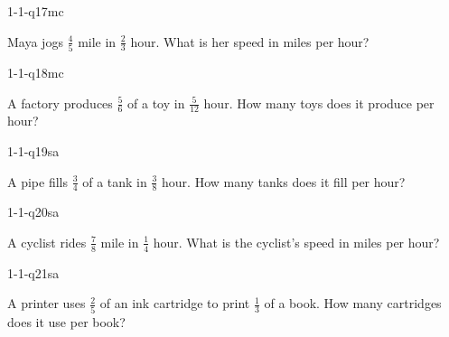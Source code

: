 \begin{practiceQuestion}{1-1-q17}{mc}
\begin{questionText}
Maya jogs $\frac{4}{5}$ mile in $\frac{2}{3}$ hour. What is her speed in miles per hour?
\end{questionText}
\end{practiceQuestion}

\begin{practiceQuestion}{1-1-q18}{mc}
\begin{questionText}
A factory produces $\frac{5}{6}$ of a toy in $\frac{5}{12}$ hour. How many toys does it produce per hour?
\end{questionText}
\end{practiceQuestion}


\begin{practiceQuestion}{1-1-q19}{sa}
\begin{questionText}
A pipe fills $\frac{3}{4}$ of a tank in $\frac{3}{8}$ hour. How many tanks does it fill per hour?
\end{questionText}
\end{practiceQuestion}

\begin{practiceQuestion}{1-1-q20}{sa}
\begin{questionText}
A cyclist rides $\frac{7}{8}$ mile in $\frac{1}{4}$ hour. What is the cyclist's speed in miles per hour?
\end{questionText}
\end{practiceQuestion}

\begin{practiceQuestion}{1-1-q21}{sa}
\begin{questionText}
A printer uses $\frac{2}{5}$ of an ink cartridge to print $\frac{1}{3}$ of a book. How many cartridges does it use per book?
\end{questionText}
\end{practiceQuestion}

